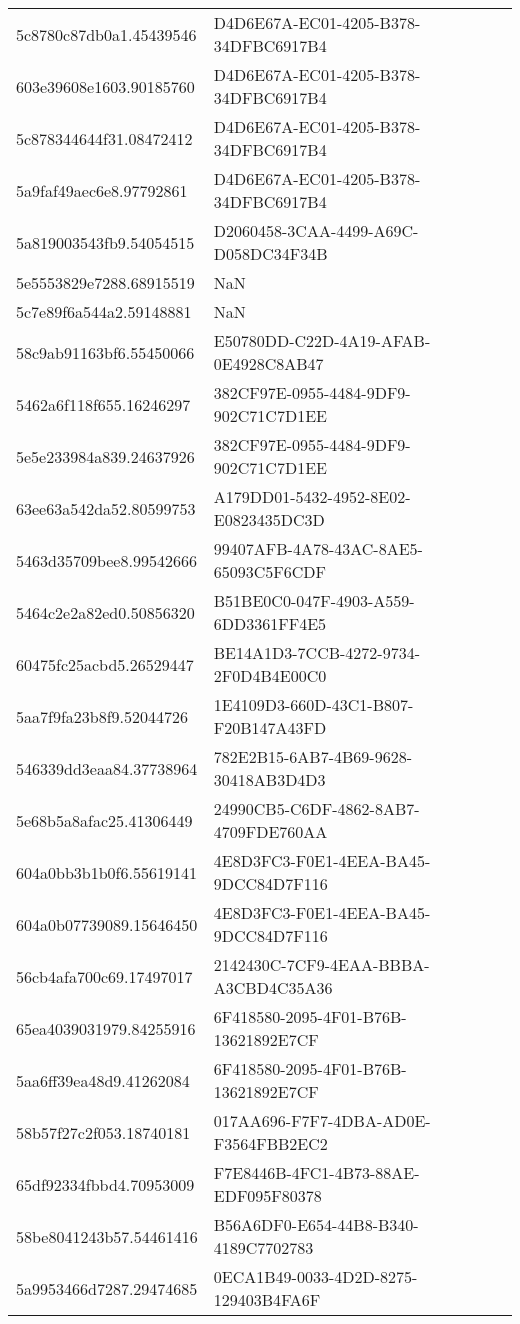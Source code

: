 \begin{tabular}{ll}
5c8780c87db0a1.45439546 & D4D6E67A-EC01-4205-B378-34DFBC6917B4 \\
603e39608e1603.90185760 & D4D6E67A-EC01-4205-B378-34DFBC6917B4 \\
5c878344644f31.08472412 & D4D6E67A-EC01-4205-B378-34DFBC6917B4 \\
5a9faf49aec6e8.97792861 & D4D6E67A-EC01-4205-B378-34DFBC6917B4 \\
5a819003543fb9.54054515 & D2060458-3CAA-4499-A69C-D058DC34F34B \\
5e5553829e7288.68915519 & NaN \\
5c7e89f6a544a2.59148881 & NaN \\
58c9ab91163bf6.55450066 & E50780DD-C22D-4A19-AFAB-0E4928C8AB47 \\
5462a6f118f655.16246297 & 382CF97E-0955-4484-9DF9-902C71C7D1EE \\
5e5e233984a839.24637926 & 382CF97E-0955-4484-9DF9-902C71C7D1EE \\
63ee63a542da52.80599753 & A179DD01-5432-4952-8E02-E0823435DC3D \\
5463d35709bee8.99542666 & 99407AFB-4A78-43AC-8AE5-65093C5F6CDF \\
5464c2e2a82ed0.50856320 & B51BE0C0-047F-4903-A559-6DD3361FF4E5 \\
60475fc25acbd5.26529447 & BE14A1D3-7CCB-4272-9734-2F0D4B4E00C0 \\
5aa7f9fa23b8f9.52044726 & 1E4109D3-660D-43C1-B807-F20B147A43FD \\
546339dd3eaa84.37738964 & 782E2B15-6AB7-4B69-9628-30418AB3D4D3 \\
5e68b5a8afac25.41306449 & 24990CB5-C6DF-4862-8AB7-4709FDE760AA \\
604a0bb3b1b0f6.55619141 & 4E8D3FC3-F0E1-4EEA-BA45-9DCC84D7F116 \\
604a0b07739089.15646450 & 4E8D3FC3-F0E1-4EEA-BA45-9DCC84D7F116 \\
56cb4afa700c69.17497017 & 2142430C-7CF9-4EAA-BBBA-A3CBD4C35A36 \\
65ea4039031979.84255916 & 6F418580-2095-4F01-B76B-13621892E7CF \\
5aa6ff39ea48d9.41262084 & 6F418580-2095-4F01-B76B-13621892E7CF \\
58b57f27c2f053.18740181 & 017AA696-F7F7-4DBA-AD0E-F3564FBB2EC2 \\
65df92334fbbd4.70953009 & F7E8446B-4FC1-4B73-88AE-EDF095F80378 \\
58be8041243b57.54461416 & B56A6DF0-E654-44B8-B340-4189C7702783 \\
5a9953466d7287.29474685 & 0ECA1B49-0033-4D2D-8275-129403B4FA6F \\

\end{tabular}
